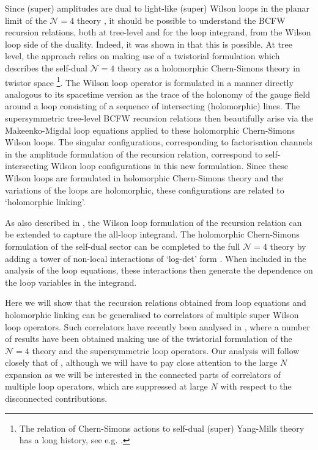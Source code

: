 \documentclass[12pt]{article}
\numberwithin{equation}{section}
\begin{document}
Since (super) amplitudes are dual to light-like (super) Wilson loops in the planar limit of the $\mathcal{N}=4$ theory \cite{Alday:2007hr,Drummond:2007aua,Brandhuber:2007yx,Bern:2008ap,Drummond:2008aq,Mason:2010yk}, it should be possible to understand the BCFW recursion relations, both at tree-level and for the loop integrand, from the Wilson loop side of the duality. Indeed, it was shown in \cite{Bullimore:2011ni} that this is possible. At tree level, the approach relies on making use of a twistorial formulation which describes the self-dual $\mathcal{N}=4$ theory as a holomorphic Chern-Simons theory in twistor space \cite{Witten:2003nn}\footnote{The relation of Chern-Simons actions to self-dual (super) Yang-Mills theory has a long history, see e.g. \cite{Sokatchev:1995nj}.}. The Wilson loop operator is formulated in a manner directly analogous to its spacetime version as the trace of the holonomy of the gauge field around a loop consisting of a sequence of intersecting (holomorphic) lines. The supersymmetric tree-level BCFW recursion relations then beautifully arise via the Makeenko-Migdal loop equations \cite{Makeenko:1979pb} applied to these holomorphic Chern-Simons Wilson loops. The singular configurations, corresponding to factorisation channels in the amplitude formulation of the recursion relation,  correspond to self-intersecting Wilson loop configurations in this new formulation. Since these Wilson loops are formulated in holomorphic Chern-Simons theory and the variations of the loops are holomorphic, these configurations are related to `holomorphic linking'.

As also described in \cite{Bullimore:2011ni}, the Wilson loop formulation of the recursion relation can be extended to capture the all-loop integrand. The holomorphic  Chern-Simons formulation of the self-dual sector can be completed to the full $\mathcal{N}=4$ theory by adding a tower of non-local interactions of `log-det' form \cite{Boels:2006ir}. When included in the analysis of the loop equations, these interactions then generate the dependence on the loop variables in the integrand.

Here we will show that the recursion relations obtained from loop equations and holomorphic linking can be generalised to correlators of multiple super Wilson loop operators. Such correlators have recently been analysed in \cite{Drummond:2025ulh,Drummond:2026lvq,Drummond:2026gpt}, where a number of results have been obtained making use of the twistorial formulation of the $\mathcal{N}=4$ theory and the supersymmetric loop operators. Our analysis will follow closely that of \cite{Bullimore:2011ni}, although we will have to pay close attention to the large $N$ expansion as we will be interested in the connected parts of correlators of multiple loop operators, which are suppressed at large $N$ with respect to the disconnected contributions. 
\end{document}

